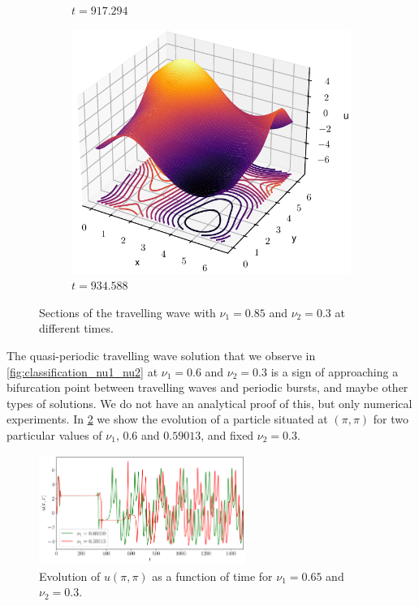 \documentclass[twoside]{article}
\begin{document}
\begin{figure}[ht]
\begin{subfigure}[b]{0.33\textwidth}
    \caption{$t=917.294$}
  \end{subfigure}\hfill
  \begin{subfigure}[b]{0.33\textwidth}
    \includegraphics[width=\textwidth]{images/slice_nu1_0.85_nu2_0.3_time_934.588.pdf}
    \caption{$t=934.588$}
  \end{subfigure}
  \caption{Sections of the travelling wave with $\nu_1=0.85$ and $\nu_2=0.3$ at different times.}
  \label{fig:sections_tw}
\end{figure}

The quasi-periodic travelling wave solution that we observe in \cref{fig:classification_nu1_nu2} at $\nu_1=0.6$ and $\nu_2=0.3$ is a sign of approaching a bifurcation point between travelling waves and periodic bursts, and maybe other types of solutions. We do not have an analytical proof of this, but only numerical experiments. In \cref{fig:qp_tw} we show the evolution of a particle situated at $(\pi,\pi)$ for two particular values of $\nu_1$, $0.6$ and $0.59013$, and fixed $\nu_2=0.3$.

\begin{figure}[ht]
  \centering
  \includegraphics[width=0.6\textwidth]{images/qp_tw.pdf}
  \caption{Evolution of $u(\pi,\pi)$ as a function of time for $\nu_1=0.65$ and $\nu_2=0.3$.}
  \label{fig:qp_tw}
\end{figure}
\end{document}
